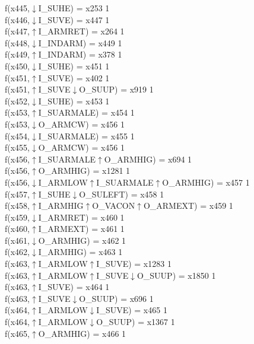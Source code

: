 f(x445,$\downarrow$I\_SUHE) = x253 {1} \\
f(x446,$\downarrow$I\_SUVE) = x447 {1} \\
f(x447,$\uparrow$I\_ARMRET) = x264 {1} \\
f(x448,$\downarrow$I\_INDARM) = x449 {1} \\
f(x449,$\uparrow$I\_INDARM) = x378 {1} \\
f(x450,$\downarrow$I\_SUHE) = x451 {1} \\
f(x451,$\uparrow$I\_SUVE) = x402 {1} \\
f(x451,$\uparrow$I\_SUVE$\downarrow$O\_SUUP) = x919 {1} \\
f(x452,$\downarrow$I\_SUHE) = x453 {1} \\
f(x453,$\uparrow$I\_SUARMALE) = x454 {1} \\
f(x453,$\downarrow$O\_ARMCW) = x456 {1} \\
f(x454,$\downarrow$I\_SUARMALE) = x455 {1} \\
f(x455,$\downarrow$O\_ARMCW) = x456 {1} \\
f(x456,$\uparrow$I\_SUARMALE$\uparrow$O\_ARMHIG) = x694 {1} \\
f(x456,$\uparrow$O\_ARMHIG) = x1281 {1} \\
f(x456,$\downarrow$I\_ARMLOW$\uparrow$I\_SUARMALE$\uparrow$O\_ARMHIG) = x457 {1} \\
f(x457,$\uparrow$I\_SUHE$\downarrow$O\_SULEFT) = x458 {1} \\
f(x458,$\uparrow$I\_ARMHIG$\uparrow$O\_VACON$\uparrow$O\_ARMEXT) = x459 {1} \\
f(x459,$\downarrow$I\_ARMRET) = x460 {1} \\
f(x460,$\uparrow$I\_ARMEXT) = x461 {1} \\
f(x461,$\downarrow$O\_ARMHIG) = x462 {1} \\
f(x462,$\downarrow$I\_ARMHIG) = x463 {1} \\
f(x463,$\uparrow$I\_ARMLOW$\uparrow$I\_SUVE) = x1283 {1} \\
f(x463,$\uparrow$I\_ARMLOW$\uparrow$I\_SUVE$\downarrow$O\_SUUP) = x1850 {1} \\
f(x463,$\uparrow$I\_SUVE) = x464 {1} \\
f(x463,$\uparrow$I\_SUVE$\downarrow$O\_SUUP) = x696 {1} \\
f(x464,$\uparrow$I\_ARMLOW$\downarrow$I\_SUVE) = x465 {1} \\
f(x464,$\uparrow$I\_ARMLOW$\downarrow$O\_SUUP) = x1367 {1} \\
f(x465,$\uparrow$O\_ARMHIG) = x466 {1} \\
